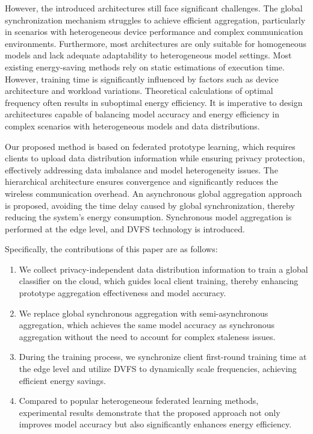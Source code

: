 \documentclass[journal]{IEEEtran}
\begin{document}
However, the introduced architectures still face significant challenges. The global synchronization mechanism struggles to achieve efficient aggregation, particularly in scenarios with heterogeneous device performance and complex communication environments. Furthermore, most architectures \cite{luo2024communication_CEC,wu2023hiflash_CEC} are only suitable for homogeneous models and lack adequate adaptability to heterogeneous model settings. Most existing energy-saving methods rely on static estimations of execution time. However, training time is significantly influenced by factors such as device architecture and workload variations. Theoretical calculations of optimal frequency often results in suboptimal energy efficiency. It is imperative to design architectures capable of balancing model accuracy and energy efficiency in complex scenarios with heterogeneous models and data distributions.

Our proposed method is based on federated prototype learning, which requires clients to upload data distribution information while ensuring privacy protection, effectively addressing data imbalance and model heterogeneity issues. The hierarchical architecture ensures convergence \cite{liu_hierarchical_2023} and significantly reduces the wireless communication overhead. An asynchronous global aggregation approach is proposed, avoiding the time delay caused by global synchronization, thereby reducing the system's energy consumption. Synchronous model aggregation is performed at the edge level, and DVFS technology is introduced. 

Specifically, the contributions of this paper are as follows:
\begin{enumerate}
    \item We collect privacy-independent data distribution information to train a global classifier on the cloud, which guides local client training, thereby enhancing prototype aggregation effectiveness and model accuracy.  
    \item We replace global synchronous aggregation with semi-asynchronous aggregation, which achieves the same model accuracy as synchronous aggregation without the need to account for complex staleness issues.  
    \item During the training process, we synchronize client first-round training time at the edge level and utilize DVFS to dynamically scale frequencies, achieving efficient energy savings.  
    \item Compared to popular heterogeneous federated learning methods, experimental results demonstrate that the proposed approach not only improves model accuracy but also significantly enhances energy efficiency.
\end{enumerate} 
\end{document}
